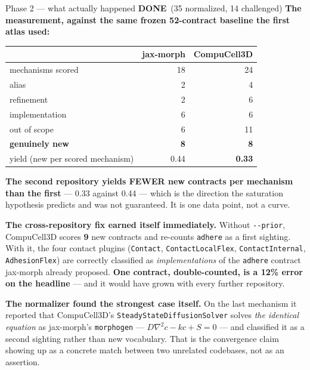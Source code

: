 \documentclass[11pt,a4paper]{article}
\newcommand{\code}[1]{\texttt{#1}}
\newcommand{\done}{\textcolor{good}{\textbf{DONE}}}
\begin{document}
\begin{phasebox}{Phase 2 --- what actually happened \hfill \done\ (35 normalized, 14 challenged)}
\textbf{The measurement, against the same frozen 52-contract baseline the first atlas used:}

\begin{center}
\small
\begin{tabular}{@{}l r r@{}}
\toprule
& \textbf{jax-morph} & \textbf{CompuCell3D}\\
\midrule
mechanisms scored & 18 & 24\\
alias & 2 & 4\\
refinement & 2 & 6\\
implementation & 6 & 6\\
out of scope & 6 & 11\\
\textbf{genuinely new} & \textbf{8} & \textbf{8}\\
\midrule
yield (new per scored mechanism) & 0.44 & \textbf{0.33}\\
\bottomrule
\end{tabular}
\end{center}

\textbf{The second repository yields FEWER new contracts per mechanism than the first} --- 0.33
against 0.44 --- which is the direction the saturation hypothesis predicts and was not guaranteed.
It is one data point, not a curve.

\textbf{The cross-repository fix earned itself immediately.} Without \code{-{}-prior}, CompuCell3D
scores \textbf{9} new contracts and re-counts \code{adhere} as a first sighting. With it, the four
contact plugins (\code{Contact}, \code{ContactLocalFlex}, \code{ContactInternal},
\code{AdhesionFlex}) are correctly classified as \emph{implementations} of the \code{adhere}
contract jax-morph already proposed. \textbf{One contract, double-counted, is a 12\% error on the
headline} --- and it would have grown with every further repository.

\textbf{The normalizer found the strongest case itself.} On the last mechanism it reported that
CompuCell3D's \code{SteadyStateDiffusionSolver} solves \emph{the identical equation} as
jax-morph's \code{morphogen} --- $D\nabla^2 c - kc + S = 0$ --- and classified it as a second
sighting rather than new vocabulary. That is the convergence claim showing up as a concrete
match between two unrelated codebases, not as an assertion.


\end{phasebox}
\end{document}
